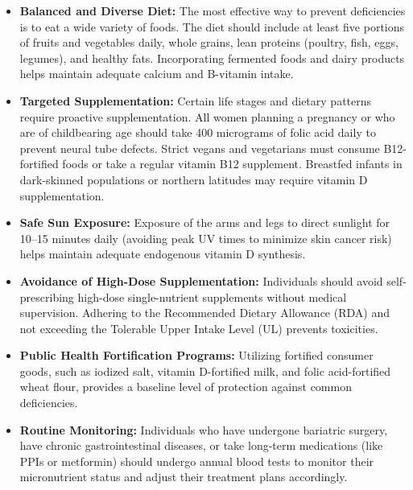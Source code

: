 \begin{itemize}
    \item \textbf{Balanced and Diverse Diet:} The most effective way to prevent deficiencies is to eat a wide variety of foods. The diet should include at least five portions of fruits and vegetables daily, whole grains, lean proteins (poultry, fish, eggs, legumes), and healthy fats. Incorporating fermented foods and dairy products helps maintain adequate calcium and B-vitamin intake.
    \item \textbf{Targeted Supplementation:} Certain life stages and dietary patterns require proactive supplementation. All women planning a pregnancy or who are of childbearing age should take 400 micrograms of folic acid daily to prevent neural tube defects. Strict vegans and vegetarians must consume B12-fortified foods or take a regular vitamin B12 supplement. Breastfed infants in dark-skinned populations or northern latitudes may require vitamin D supplementation.
    \item \textbf{Safe Sun Exposure:} Exposure of the arms and legs to direct sunlight for 10--15 minutes daily (avoiding peak UV times to minimize skin cancer risk) helps maintain adequate endogenous vitamin D synthesis.
    \item \textbf{Avoidance of High-Dose Supplementation:} Individuals should avoid self-prescribing high-dose single-nutrient supplements without medical supervision. Adhering to the Recommended Dietary Allowance (RDA) and not exceeding the Tolerable Upper Intake Level (UL) prevents toxicities.
    \item \textbf{Public Health Fortification Programs:} Utilizing fortified consumer goods, such as iodized salt, vitamin D-fortified milk, and folic acid-fortified wheat flour, provides a baseline level of protection against common deficiencies.
    \item \textbf{Routine Monitoring:} Individuals who have undergone bariatric surgery, have chronic gastrointestinal diseases, or take long-term medications (like PPIs or metformin) should undergo annual blood tests to monitor their micronutrient status and adjust their treatment plans accordingly.
\end{itemize}

